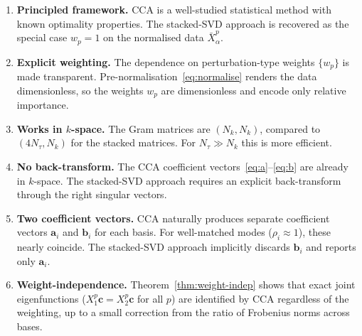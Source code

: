 \documentclass[a4paper,11pt]{article}
\newcommand{\va}{\bm{a}}
\newcommand{\vb}{\bm{b}}
\newcommand{\vc}{\bm{c}}
\newcommand{\Xb}[2]{X_{#1}^{#2}}
\newcommand{\Xn}[2]{\bar{X}_{#1}^{#2}}
\newcommand{\Nk}{N_k}
\newcommand{\Nt}{N_\tau}
\theoremstyle{plain}
\begin{document}
\begin{enumerate}
    \item \textbf{Principled framework.} CCA is a well-studied statistical method with known optimality properties. The stacked-SVD approach is recovered as the special case $w_p = 1$ on the normalised data $\Xn{\alpha}{p}$.

    \item \textbf{Explicit weighting.} The dependence on perturbation-type weights $\{w_p\}$ is made transparent. Pre-normalisation~\eqref{eq:normalise} renders the data dimensionless, so the weights $w_p$ are dimensionless and encode only relative importance.

    \item \textbf{Works in $k$-space.} The Gram matrices are $(\Nk, \Nk)$, compared to $(4\Nt, \Nk)$ for the stacked matrices. For $\Nt \gg \Nk$ this is more efficient.

    \item \textbf{No back-transform.} The CCA coefficient vectors~\eqref{eq:a}--\eqref{eq:b} are already in $k$-space. The stacked-SVD approach requires an explicit back-transform through the right singular vectors.

    \item \textbf{Two coefficient vectors.} CCA naturally produces separate coefficient vectors $\va_i$ and $\vb_i$ for each basis. For well-matched modes ($\rho_i \approx 1$), these nearly coincide. The stacked-SVD approach implicitly discards $\vb_i$ and reports only $\va_i$.

    \item \textbf{Weight-independence.} Theorem~\ref{thm:weight-indep} shows that exact joint eigenfunctions ($\Xb{1}{p}\vc = \Xb{2}{p}\vc$ for all $p$) are identified by CCA regardless of the weighting, up to a small correction from the ratio of Frobenius norms across bases.
\end{enumerate}
\end{document}
